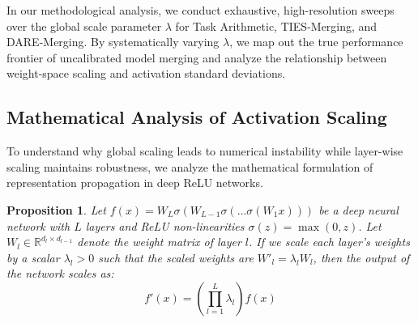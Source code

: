 \documentclass{article}
\theoremstyle{plain}
\newtheorem{proposition}[theorem]{Proposition}
\theoremstyle{definition}
\theoremstyle{remark}
\begin{document}
In our methodological analysis, we conduct exhaustive, high-resolution sweeps over the global scale parameter $\lambda$ for Task Arithmetic, TIES-Merging, and DARE-Merging. By systematically varying $\lambda$, we map out the true performance frontier of uncalibrated model merging and analyze the relationship between weight-space scaling and activation standard deviations.

\subsection{Mathematical Analysis of Activation Scaling}
To understand why global scaling leads to numerical instability while layer-wise scaling maintains robustness, we analyze the mathematical formulation of representation propagation in deep ReLU networks.

\begin{proposition}
\label{prop:homogeneity}
Let $f(x) = W_L \sigma(W_{L-1} \sigma(\ldots \sigma(W_1 x)))$ be a deep neural network with $L$ layers and ReLU non-linearities $\sigma(z) = \max(0, z)$. Let $W_l \in \mathbb{R}^{d_l \times d_{l-1}}$ denote the weight matrix of layer $l$. If we scale each layer's weights by a scalar $\lambda_l > 0$ such that the scaled weights are $W'_l = \lambda_l W_l$, then the output of the network scales as:
\begin{equation}
    f'(x) = \left( \prod_{l=1}^L \lambda_l \right) f(x)
\end{equation}
\end{proposition}
\end{document}
